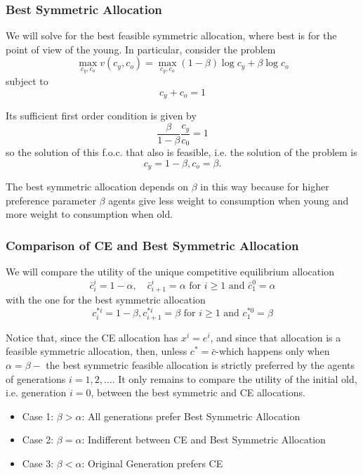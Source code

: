 \documentclass[10pt]{article}
\begin{document}
\subsubsection{Best Symmetric Allocation}

We will solve for the best feasible symmetric allocation, where best is for the point of view of the young. In particular, consider the problem
$$
\max _{c_y, c_o} v\left(c_y, c_o\right)=\max _{c_y, c_o}(1-\beta) \log c_y+\beta \log c_o
$$
subject to
$$
c_y+c_o=1
$$

Its sufficient first order condition is given by
$$
\frac{\beta}{1-\beta} \frac{c_y}{c_0}=1
$$
so the solution of this f.o.c. that also is feasible, i.e. the solution of the problem is
$$
c_y=1-\beta, c_o=\beta .
$$

The best symmetric allocation depends on $\beta$ in this way because for higher preference parameter $\beta$ agents give less weight to consumption when young and more weight to consumption when old.

\subsubsection{Comparison of CE and Best Symmetric Allocation}

We will compare the utility of the unique competitive equilibrium allocation
$$
\bar{c}_i^i=1-\alpha, \quad \bar{c}_{i+1}^i=\alpha \text { for } i \geq 1 \text { and } \bar{c}_1^0=\alpha
$$
with the one for the best symmetric allocation
$$
c_i^{* i}=1-\beta, c_{i+1}^{* i}=\beta \text { for } i \geq 1 \text { and } c_1^{* 0}=\beta
$$

Notice that, since the CE allocation has $x^i=e^i$, and since that allocation is a feasible symmetric allocation, then, unless $c^*=\bar{c}$-which happens only when $\alpha=\beta-$ the best symmetric feasible allocation is strictly preferred by the agents of generations $i=1,2, \ldots$. It only remains to compare the utility of the initial old, i.e. generation $i=0$, between the best symmetric and CE allocations.

\begin{itemize}
    \item Case 1: $\beta > \alpha$: All generations prefer Best Symmetric Allocation
    \item Case 2: $\beta = \alpha$: Indifferent between CE and Best Symmetric Allocation
    \item Case 3: $\beta < \alpha$: Original Generation prefers CE
\end{itemize}
\end{document}
